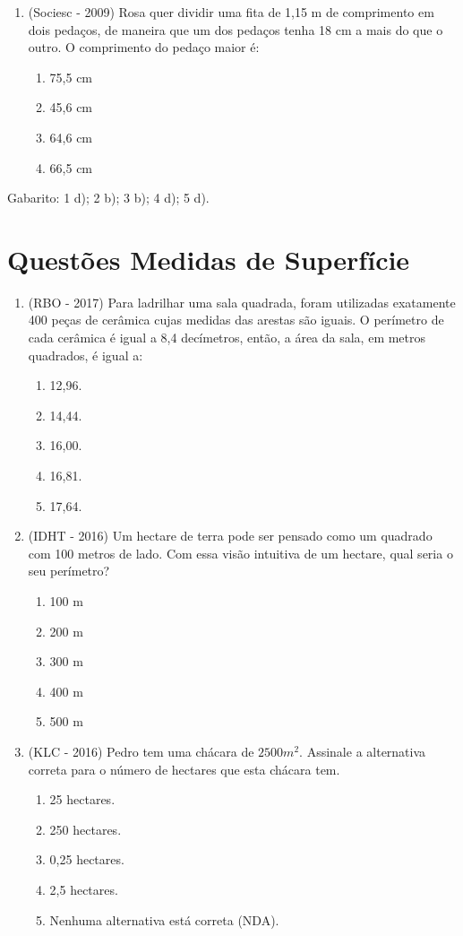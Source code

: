 \begin{enumerate}
 \item (Sociesc - 2009) Rosa quer dividir uma fita de 1,15 m de comprimento em dois pedaços, de maneira que um dos pedaços tenha 18 cm a mais do que o outro. O comprimento do pedaço maior é:
 \begin{enumerate}
  \item 75,5 cm
  \item 45,6 cm
  \item 64,6 cm
  \item 66,5 cm
 \end{enumerate}

 \end{enumerate}
 
 Gabarito: 1 d); 2 b); 3 b); 4 d); 5 d).
 
 \section{Questões Medidas de Superfície}
\begin{enumerate}
 \item (RBO - 2017) Para ladrilhar uma sala quadrada, foram utilizadas exatamente 400 peças de cerâmica cujas medidas das arestas são iguais. O perímetro de cada cerâmica é igual a 8,4 decímetros, então, a área da sala, em metros quadrados, é igual a:
 \begin{enumerate}
 \item 12,96.
 \item 14,44.
 \item 16,00.
 \item 16,81.
 \item 17,64.
\end{enumerate}

\item (IDHT - 2016) Um hectare de terra pode ser pensado como um quadrado com 100 metros de lado. Com essa visão intuitiva de um hectare, qual seria o seu perímetro?
\begin{enumerate}
 \item 100 m
 \item 200 m
 \item 300 m
 \item 400 m
 \item 500 m
\end{enumerate}

\item (KLC - 2016) Pedro tem uma chácara de $2500 m^2$. Assinale a alternativa correta para o número de hectares que esta chácara tem.
\begin{enumerate}
 \item 25 hectares.
 \item 250 hectares.
 \item 0,25 hectares.
 \item 2,5 hectares.
 \item Nenhuma alternativa está correta (NDA).
\end{enumerate}
\end{enumerate}

